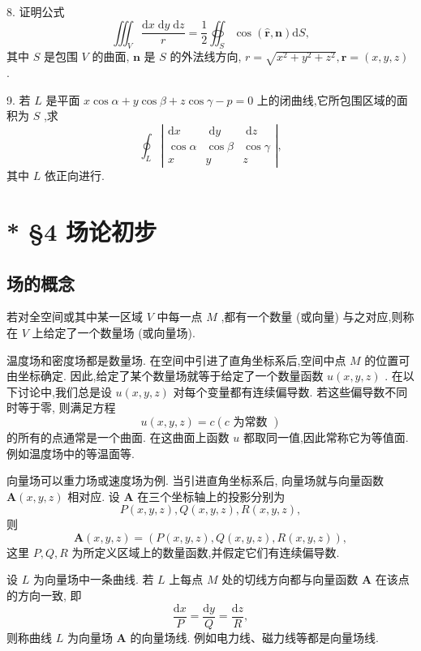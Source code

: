 8. 证明公式
\[
{\iiint }_{V}\frac{\mathrm{d}x\mathrm{\;d}y\mathrm{\;d}z}{r} = \frac{1}{2}{\oiint }_{S}\cos \left( {\widehat{\mathbf{r}},\mathbf{n}}\right) \mathrm{d}S,
\]
其中 \(S\) 是包围 \(V\) 的曲面, \(\mathbf{n}\) 是 \(S\) 的外法线方向, \(r = \sqrt{{x}^{2} + {y}^{2} + {z}^{2}},\mathbf{r} = \left( {x,y,z}\right)\) .

9. 若 \(L\) 是平面 \(x\cos \alpha  + y\cos \beta  + z\cos \gamma  - p = 0\) 上的闭曲线,它所包围区域的面积为 \(S\) ,求
\[
{\oint }_{L}\left| \begin{matrix} \mathrm{d}x & \mathrm{\;d}y & \mathrm{\;d}z \\  \cos \alpha & \cos \beta & \cos \gamma \\  x & y & z \end{matrix}\right| ,
\]
其中 \(L\) 依正向进行.

\section{* §4 场论初步}

\subsection{场的概念}

若对全空间或其中某一区域 \(V\) 中每一点 \(M\) ,都有一个数量 (或向量) 与之对应,则称在 \(V\) 上给定了一个数量场 (或向量场).

温度场和密度场都是数量场. 在空间中引进了直角坐标系后,空间中点 \(M\) 的位置可由坐标确定. 因此,给定了某个数量场就等于给定了一个数量函数 \(u\left( {x,y,z}\right)\) . 在以下讨论中,我们总是设 \(u\left( {x,y,z}\right)\) 对每个变量都有连续偏导数. 若这些偏导数不同时等于零, 则满足方程
\[
u\left( {x,y,z}\right)  = c\left( {c\text{ 为常数 }}\right)
\]
的所有的点通常是一个曲面. 在这曲面上函数 \(u\) 都取同一值,因此常称它为等值面. 例如温度场中的等温面等.

向量场可以重力场或速度场为例. 当引进直角坐标系后, 向量场就与向量函数 \(\mathbf{A}\left( {x,y,z}\right)\) 相对应. 设 \(\mathbf{A}\) 在三个坐标轴上的投影分别为
\[
P\left( {x,y,z}\right) ,Q\left( {x,y,z}\right) ,R\left( {x,y,z}\right) ,
\]
则
\[
\mathbf{A}\left( {x,y,z}\right)  = \left( {P\left( {x,y,z}\right) ,Q\left( {x,y,z}\right) ,R\left( {x,y,z}\right) }\right) ,
\]
这里 \(P,Q,R\) 为所定义区域上的数量函数,并假定它们有连续偏导数.

设 \(L\) 为向量场中一条曲线. 若 \(L\) 上每点 \(M\) 处的切线方向都与向量函数 \(\mathbf{A}\) 在该点的方向一致, 即
\[
\frac{\mathrm{d}x}{P} = \frac{\mathrm{d}y}{Q} = \frac{\mathrm{d}z}{R},
\]
则称曲线 \(L\) 为向量场 \(\mathbf{A}\) 的向量场线. 例如电力线、磁力线等都是向量场线.

